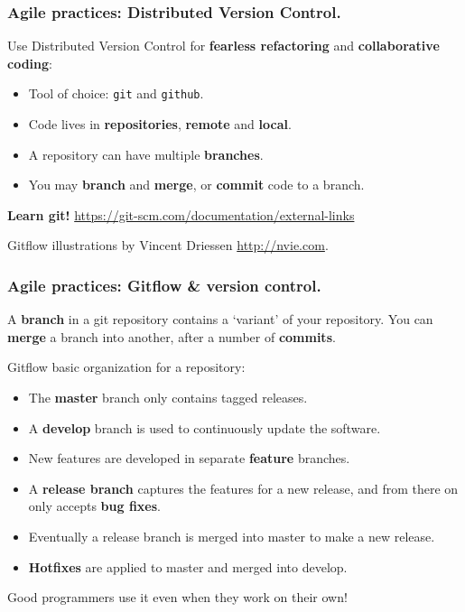 \documentclass{beamer} %
\newcommand\emc[1]{\textcolor{midred}{\textbf{#1}}}
\begin{document}
\begin{frame}

\frametitle{Agile practices: Distributed Version Control.}

Use Distributed Version Control for \emc{fearless refactoring} and \emc{collaborative coding}:
\begin{itemize}
  \item Tool of choice: \texttt{git} and \texttt{github}.
  \item Code lives in \emc{repositories}, \emc{remote} and \emc{local}.
  \item A repository can have multiple \emc{branches}. 
  \item You may \emc{branch} and \emc{merge}, or \emc{commit} code to a branch.
\end{itemize}

\vspace{5mm}
\emc{Learn git!} \url{https://git-scm.com/documentation/external-links} 

\vspace{5mm}
Gitflow illustrations by Vincent Driessen \url{http://nvie.com}.


\end{frame}


\begin{frame}
\frametitle{Agile practices: Gitflow \& version control.}

A \emc{branch} in a git repository contains a `variant' of your repository. You can \emc{merge} a branch into another, after a number of \emc{commits}.

\vspace{5mm}
Gitflow basic organization for a repository:
\begin{itemize}
  \item The \emc{master} branch only contains tagged releases.
  \item A \emc{develop} branch is used to continuously update the software.
  \item New features are developed in separate \emc{feature} branches.
  \item A \emc{release branch} captures the features for a new release, and from there on only accepts \emc{bug fixes}.
  \item Eventually a release branch is merged into master to make a new release.
  \item \emc{Hotfixes} are applied to master and merged into develop. 
  \end{itemize}

Good programmers use it even when they work on their own!
\end{frame}
\end{document}
